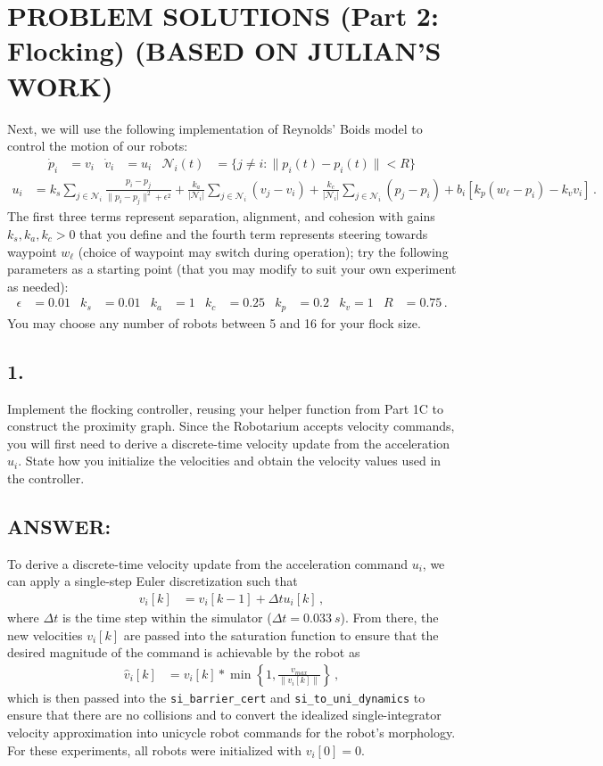 \documentclass[11pt]{article}
\begin{document}
\clearpage
\section*{PROBLEM SOLUTIONS (Part 2: Flocking) (BASED ON JULIAN'S WORK)}
Next, we will use the following implementation of Reynolds' Boids model to control the motion of our robots:
\begin{align*}
    \dot p_i&=v_i & \dot v_i&=u_i & \mathcal N_i(t)&=\{j\neq i:\|p_i(t)-p_i(t)\|<R\}
\end{align*}
\begin{align*}
    u_i&=k_s\sum_{j\in\mathcal N_i}\frac{p_i-p_j}{\|p_i-p_j\|^2+\epsilon^2}+\frac{k_a}{|\mathcal N_i|}\sum_{j\in\mathcal N_i}(v_j-v_i)+\frac{k_c}{|\mathcal N_i|}\sum_{j\in\mathcal N_i}(p_j-p_i)+b_i[k_p(w_\ell-p_i)-k_vv_i]\,.
\end{align*}
The first three terms represent separation, alignment, and cohesion with gains $k_s,k_a,k_c>0$ that you define and the fourth term represents steering towards waypoint $w_\ell$ (choice of waypoint may switch during operation); try the following parameters as a starting point (that you may modify to suit your own experiment as needed):
\begin{align*}
    \epsilon&=0.01 & k_s&=0.01 & k_a&=1 & k_c&=0.25 & k_p&=0.2 & k_v=1 & R&=0.75\,.
\end{align*}
You may choose any number of robots between 5 and 16 for your flock size.

\subsection*{1.}
Implement the flocking controller, reusing your helper function from Part 1C to construct the proximity graph. Since the Robotarium accepts velocity commands, you will first need to derive a discrete-time velocity update from the acceleration $u_i$. State how you initialize the velocities and obtain the velocity values used in the controller.

\subsection*{ANSWER:}
To derive a discrete-time velocity update from the acceleration command $u_i$, we can apply a single-step Euler discretization such that
\begin{align*}
    v_i[k]&=v_i[k-1]+\Delta tu_i[k]\,,
\end{align*}
where $\Delta t$ is the time step within the simulator ($\Delta t=0.033\ s$). From there, the new velocities $v_i[k]$ are passed into the saturation function to ensure that the desired magnitude of the command is achievable by the robot as
\begin{align*}
    \hat v_i[k]&=v_i[k]*\min\left\{1,\frac{v_{max}}{\|v_i[k]\|}\right\}\,,
\end{align*}
which is then passed into the \texttt{si\_barrier\_cert} and \texttt{si\_to\_uni\_dynamics} to ensure that there are no collisions and to convert the idealized single-integrator velocity approximation into unicycle robot commands for the robot's morphology. For these experiments, all robots were initialized with $v_i[0]=0$.
\end{document}
